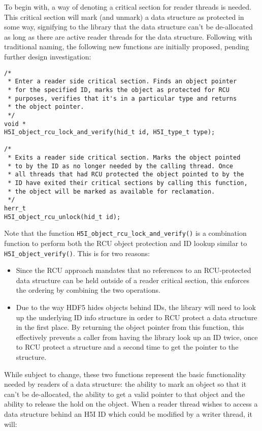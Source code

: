 \documentclass[../HDF5_RFC.tex]{subfiles}
\begin{document}
To begin with, a way of denoting a critical section for reader threads is needed. This critical section
will mark (and unmark) a data structure as protected in some way, signifying to the library that the data
structure can't be de-allocated as long as there are active reader threads for the data structure.
Following with traditional naming, the following new functions are initially proposed, pending further
design investigation:

\begin{verbatim}
/*
 * Enter a reader side critical section. Finds an object pointer
 * for the specified ID, marks the object as protected for RCU
 * purposes, verifies that it's in a particular type and returns
 * the object pointer.
 */
void *
H5I_object_rcu_lock_and_verify(hid_t id, H5I_type_t type);

/*
 * Exits a reader side critical section. Marks the object pointed
 * to by the ID as no longer needed by the calling thread. Once
 * all threads that had RCU protected the object pointed to by the
 * ID have exited their critical sections by calling this function,
 * the object will be marked as available for reclamation.
 */
herr_t
H5I_object_rcu_unlock(hid_t id);
\end{verbatim}

Note that the function \texttt{H5I\_object\_rcu\_lock\_and\_verify()} is a combination function to perform
both the RCU object protection and ID lookup similar to \texttt{H5I\_object\_verify()}. This is for two
reasons:

\begin{itemize}
    \item Since the RCU approach mandates that no references to an RCU-protected data structure can be held
          outside of a reader critical section, this enforces the ordering by combining the two operations.
    \item Due to the way HDF5 hides objects behind IDs, the library will need to look up the underlying ID
          info structure in order to RCU protect a data structure in the first place. By returning the
          object pointer from this function, this effectively prevents a caller from having the library
          look up an ID twice, once to RCU protect a structure and a second time to get the pointer to the
          structure.
\end{itemize}

While subject to change, these two functions represent the basic functionality needed by readers of a
data structure: the ability to mark an object so that it can't be de-allocated, the ability to get a valid
pointer to that object and the ability to release the hold on the object. When a reader thread wishes to
access a data structure behind an H5I ID which could be modified by a writer thread, it will:
\end{document}
